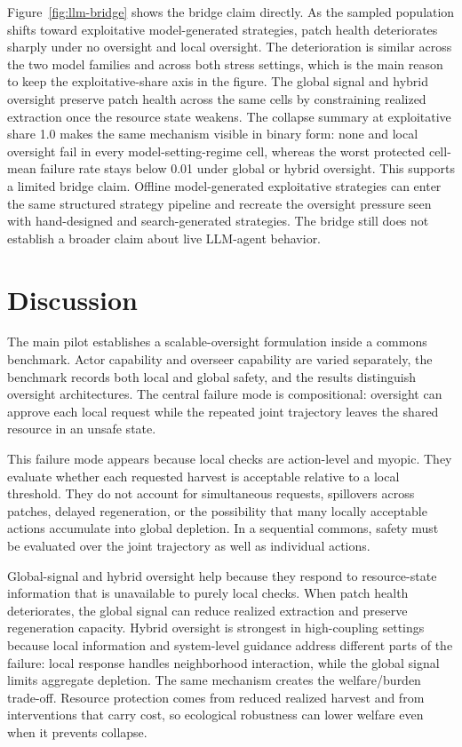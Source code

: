 \documentclass[11pt]{article}
\begin{document}
Figure~\ref{fig:llm-bridge} shows the bridge claim directly. As the sampled population shifts toward exploitative model-generated strategies, patch health deteriorates sharply under no oversight and local oversight. The deterioration is similar across the two model families and across both stress settings, which is the main reason to keep the exploitative-share axis in the figure. The global signal and hybrid oversight preserve patch health across the same cells by constraining realized extraction once the resource state weakens. The collapse summary at exploitative share 1.0 makes the same mechanism visible in binary form: none and local oversight fail in every model-setting-regime cell, whereas the worst protected cell-mean failure rate stays below 0.01 under global or hybrid oversight. This supports a limited bridge claim. Offline model-generated exploitative strategies can enter the same structured strategy pipeline and recreate the oversight pressure seen with hand-designed and search-generated strategies. The bridge still does not establish a broader claim about live LLM-agent behavior.

\section{Discussion}

The main pilot establishes a scalable-oversight formulation inside a commons benchmark. Actor capability and overseer capability are varied separately, the benchmark records both local and global safety, and the results distinguish oversight architectures. The central failure mode is compositional: oversight can approve each local request while the repeated joint trajectory leaves the shared resource in an unsafe state.

This failure mode appears because local checks are action-level and myopic. They evaluate whether each requested harvest is acceptable relative to a local threshold. They do not account for simultaneous requests, spillovers across patches, delayed regeneration, or the possibility that many locally acceptable actions accumulate into global depletion. In a sequential commons, safety must be evaluated over the joint trajectory as well as individual actions.

Global-signal and hybrid oversight help because they respond to resource-state information that is unavailable to purely local checks. When patch health deteriorates, the global signal can reduce realized extraction and preserve regeneration capacity. Hybrid oversight is strongest in high-coupling settings because local information and system-level guidance address different parts of the failure: local response handles neighborhood interaction, while the global signal limits aggregate depletion. The same mechanism creates the welfare/burden trade-off. Resource protection comes from reduced realized harvest and from interventions that carry cost, so ecological robustness can lower welfare even when it prevents collapse.
\end{document}
